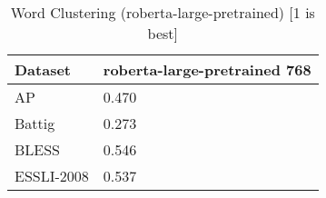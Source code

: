 \begin{table}[]
\centering
\begin{tabular}{l|l}
\hline
Dataset & roberta-large-pretrained 768 \\
\hline
AP & 0.470 \\ 
Battig & 0.273 \\ 
BLESS & 0.546 \\ 
ESSLI-2008 & 0.537
\end{tabular}
\caption{Word Clustering (roberta-large-pretrained) [1 is best]}
\label{tab:cluster-roberta-large-pretrained}
\end{table}
